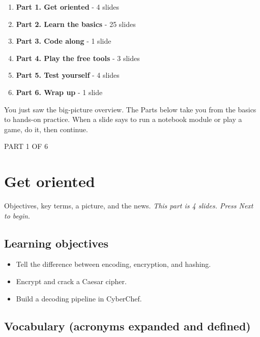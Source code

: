 \documentclass[12pt,openany]{book}
\begin{document}
\begin{enumerate}
  \item \textbf{Part 1. Get oriented} - 4 slides
  \item \textbf{Part 2. Learn the basics} - 25 slides
  \item \textbf{Part 3. Code along} - 1 slide
  \item \textbf{Part 4. Play the free tools} - 3 slides
  \item \textbf{Part 5. Test yourself} - 4 slides
  \item \textbf{Part 6. Wrap up} - 1 slide
\end{enumerate}

You just saw the big-picture overview. The Parts below take you from the basics to hands-on practice. When a slide says to run a notebook module or play a game, do it, then continue.

\medskip

\vspace{4pt}\noindent\textsc{PART 1 OF 6}


\section*{Get oriented}

Objectives, key terms, a picture, and the news.
{\small\itshape\color{gray}This part is 4 slides. Press Next to begin.}

\medskip

\subsection*{Learning objectives}


\begin{itemize}

  \item Tell the difference between encoding, encryption, and hashing.

  \item Encrypt and crack a Caesar cipher.

  \item Build a decoding pipeline in CyberChef.

\end{itemize}

\medskip

\subsection*{Vocabulary (acronyms expanded and defined)}
\end{document}
